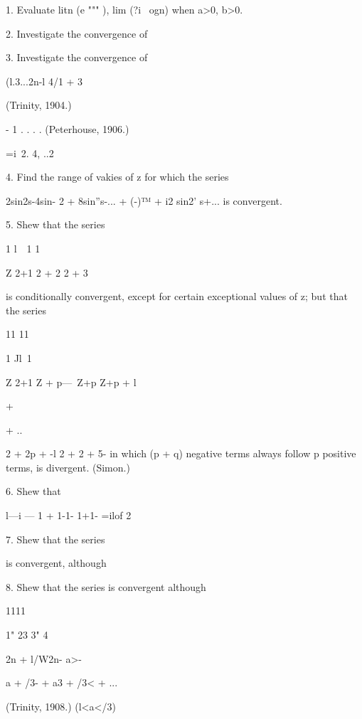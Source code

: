 1. Evaluate litn (e """ ), lim (?i~ ogn) when a>0, b>0.



2. Investigate the convergence of






3. Investigate the convergence of

(l.3...2n-l 4/1 + 3



(Trinity, 1904.)



- 1 . . . . (Peterhouse, 1906.)

 =i\ 2. 4, ..2%

4. Find the range of vakies of z for which the series

2sin2s-4sin- 2 + 8sin''s-... + (-)™ + i2 sin2' s+... is convergent.

5. Shew that the series

1 l\ \ 1 1\

Z 2+1 2 + 2 2 + 3

is conditionally convergent, except for certain exceptional values of
z; but that the series

11 11



1 Jl\ 1

Z 2+1 Z + p—\ Z+p Z+p + l



+



+ ..



2 + 2p + -l 2 + 2 + 5- in which (p + q) negative terms always follow p
positive terms, is divergent. (Simon.)

6. Shew that

l—i — 1 + 1-1- 1+1- =ilof 2

7. Shew that the series



is convergent, although

8. Shew that the series is convergent although



1111

1" 23 3" 4



 2n + l/W2n- a>-

a + /3- + a3 + /3< + ...



(Trinity, 1908.) (l<a</3)



